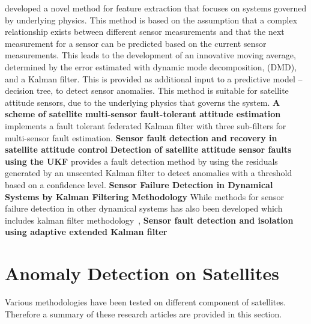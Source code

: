 \cite{DeSilva2020} developed a novel method for feature extraction that focuses on systems governed by underlying physics. This method is based on the assumption that a complex relationship exists between different sensor measurements and that the next measurement for a sensor can be predicted based on the current sensor measurements. This leads to the development of an innovative moving average, determined by the error estimated with dynamic mode decomposition, (DMD), and a Kalman filter. This is provided as additional input to a predictive model -- decision tree, to detect sensor anomalies. This method is suitable for satellite attitude sensors, due to the underlying physics that governs the system.
\textbf{A scheme of satellite multi-sensor fault-tolerant attitude estimation}
\cite{Zhou2016} implements a fault tolerant federated Kalman filter with three sub-filters for multi-sensor fault estimation. 
\textbf{Sensor fault detection and recovery in satellite attitude control}
\cite{Nasrolahi2018} 
\textbf{Detection of satellite attitude sensor faults using the UKF}
\cite{Xiong2007} provides a fault detection method by using the residuals generated by an unscented Kalman filter to detect anomalies with a threshold based on a confidence level. 
\textbf{Sensor Failure Detection in Dynamical Systems by Kalman Filtering Methodology}
While methods for sensor failure detection in other dynamical systems has also been developed which includes kalman filter methodology~\cite{Ciftciogl1991},
\textbf{Sensor fault detection and isolation using adaptive extended Kalman filter}
\cite{van2012sensor}

\section{Anomaly Detection on Satellites}
Various methodologies have been tested on different component of satellites. Therefore a summary of these research articles are provided in this section.


